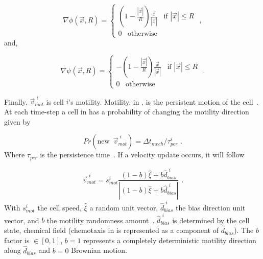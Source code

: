 \begin{equation}\label{eq:abm:physi-ad-pot}
    \nabla\phi(\Vec{x}, R) = \begin{cases}
        \left(1 - \frac{|\Vec{x}|}{R} \right)\frac{\Vec{x}}{|\Vec{x}|}\,\,\,\text{    if }|\Vec{x}|\leq R\\
        0\,\,\,\text{    otherwise}
    \end{cases}\,\,,
\end{equation}
\noindent and,

\begin{equation}\label{eq:abm:physi-rep-pot}
    \nabla\psi(\Vec{x}, R) = \begin{cases}
        -\left(1 - \frac{|\Vec{x}|}{R} \right)\frac{\Vec{x}}{|\Vec{x}|}\,\,\,\text{    if }|\Vec{x}|\leq R\\
        0\,\,\,\text{    otherwise}
    \end{cases}\,\,.
\end{equation}

Finally, $\Vec{v}^{\,\,i}_{mot}$ is cell $i$'s motility. Motility, in \psc, is the persistent motion of the cell~\cite{ghaffarizadeh_physicell_2018}. At each time-step a cell in \pscs has a probability of changing the motility direction given by

\begin{equation}\label{eq:abm:physi:change-vmot}
    Pr(\text{new}\,\,\,\Vec{v}^{\,\,i}_{mot}) = \Delta t_{mech} / \tau^i_{per}\,\,.
\end{equation}
\noindent Where $\tau_{per}$ is the persistence time~\cite{ghaffarizadeh_physicell_2018}. If a velocity update occurs, it will follow

\begin{equation}
    \Vec{v}^{\,\,i}_{mot} = s^i_{mot} \frac{\left(1 - b\right) \hat{\xi} + b \hat{d}^{\,\,i}_{bias}}{|\left(1 - b\right) \hat{\xi} + b \hat{d}^{\,\,i}_{bias}|}\,\,.
\end{equation}
\noindent With $s^i_{mot}$ the cell speed, $\hat{\xi}$ a random unit vector, $\hat{d}^{\,\,i}_{bias}$ the bias direction unit vector, and $b$ the motility randomness amount~\cite{ghaffarizadeh_physicell_2018}. $\hat{d}^{\,\,i}_{bias}$ is determined by the cell state, chemical field (chemotaxis in \pscs is represented as a component of $\hat{d}_{bias}$). The $b$ factor  is $\in[0, 1]$, $b=1$ represents a completely deterministic motility direction along $\hat{d}_{bias}$ and $b=0$ Brownian motion.

